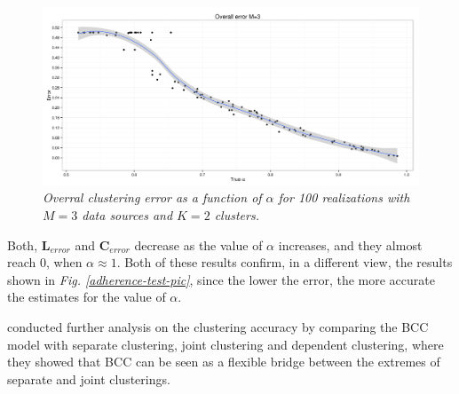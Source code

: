 \begin{figure}[!ht]
\begin{center}
 \includegraphics[scale = 0.39]{images/overallError.png}
\caption{\emph{Overral clustering error as a function of $\alpha$ for 100 realizations with $M=3$ data sources and $K=2$ clusters.}}
\label{overall-error-pic}
\end{center}
\end{figure}

Both, $\mathbf{L}_{error}$ and $\mathbf{C}_{error}$ decrease as the value of $\alpha$ increases, and they almost reach 0, when $\alpha \approx 1$. Both of these results confirm, in a different view, the results shown in \emph{Fig. \ref{adherence-test-pic}}, since the lower the error, the more accurate the estimates for the value of $\alpha$.

\citet{Lock2013} conducted further analysis on the clustering accuracy by comparing the BCC model with separate clustering, joint clustering and dependent clustering, where they showed that BCC can be seen as a flexible bridge between the extremes of separate and joint clusterings.